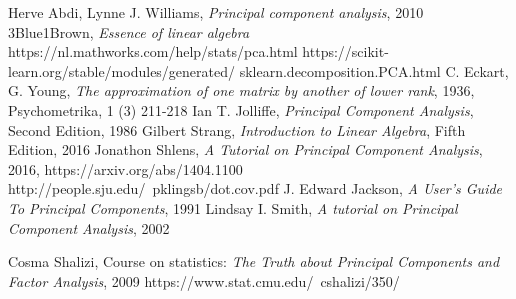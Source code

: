 \documentclass[10pt,twocolumn]{article}
\begin{document}
 Herve Abdi, Lynne J. Williams, \textit{Principal component analysis}, 2010
 3Blue1Brown, \textit{Essence of linear algebra}
 https://nl.mathworks.com/help/stats/pca.html
 https://scikit-learn.org/stable/modules/generated/
sklearn.decomposition.PCA.html
 C. Eckart, G. Young, \textit{The approximation of one matrix by another of lower rank}, 1936, Psychometrika, 1 (3) 211-218
 Ian T. Jolliffe, \textit{Principal Component Analysis}, Second Edition, 1986
 Gilbert Strang, \textit{Introduction to Linear Algebra}, Fifth Edition, 2016
 Jonathon Shlens, \textit{A Tutorial on Principal Component Analysis}, 2016, https://arxiv.org/abs/1404.1100
 http://people.sju.edu/~pklingsb/dot.cov.pdf
 J. Edward Jackson, \textit{A User's Guide To Principal Components}, 1991
 Lindsay I. Smith, \textit{A tutorial on Principal Component Analysis}, 2002

 Cosma Shalizi, Course on statistics: \textit{The Truth about Principal Components and Factor Analysis}, 2009 https://www.stat.cmu.edu/~cshalizi/350/
\end{document}
